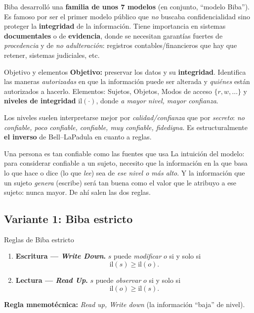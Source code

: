 \documentclass[11pt,a4paper]{article}
\newcommand{\il}{\mathrm{il}}                     %
\begin{document}
Biba desarrolló una \textbf{familia de unos 7 modelos} (en conjunto, ``modelo Biba''). Es
famoso por ser el primer modelo público que \emph{no} buscaba confidencialidad sino proteger
la \textbf{integridad} de la información. Tiene importancia en sistemas \textbf{documentales}
o de \textbf{evidencia}, donde se necesitan garantías fuertes de \emph{procedencia} y de
\emph{no adulteración}: registros contables/financieros que hay que retener, sistemas
judiciales, etc.

\begin{defbox}{Objetivo y elementos}
\textbf{Objetivo:} preservar los datos y su \textbf{integridad}. Identifica las maneras
\emph{autorizadas} en que la información puede ser alterada y \emph{quiénes} están autorizados
a hacerlo. Elementos: Sujetos, Objetos, Modos de acceso $\{r,w,\dots\}$ y
\textbf{niveles de integridad} $\il(\cdot)$, donde \emph{a mayor nivel, mayor confianza}.
\end{defbox}

Los niveles suelen interpretarse mejor por \emph{calidad/confianza} que por
\emph{secreto}: \emph{no confiable, poco confiable, confiable, muy confiable, fidedigna}.
Es estructuralmente \textbf{el inverso} de Bell--LaPadula en cuanto a reglas.

\begin{anecbox}{Una persona es tan confiable como las fuentes que usa}
La intuición del modelo: para considerar confiable a un sujeto, necesito que la información
en la que basa lo que hace o dice (lo que \emph{lee}) sea de \emph{ese nivel o más alto}. Y la
información que un sujeto \emph{genera} (escribe) será tan buena como el valor que le atribuyo
a ese sujeto: nunca mayor. De ahí salen las dos reglas.
\end{anecbox}

\subsection{Variante 1: Biba estricto}
\begin{defbox}{Reglas de Biba estricto}
\begin{enumerate}[leftmargin=1.7em,itemsep=3pt]
  \item \textbf{Escritura — \emph{Write Down}.} $s$ puede \emph{modificar} $o$ si y solo si
        \[ \il(s) \ge \il(o). \]
  \item \textbf{Lectura — \emph{Read Up}.} $s$ puede \emph{observar} $o$ si y solo si
        \[ \il(o) \ge \il(s). \]
\end{enumerate}
\textbf{Regla mnemotécnica:} \emph{Read up, Write down} (la información ``baja'' de nivel).
\end{defbox}
\end{document}
